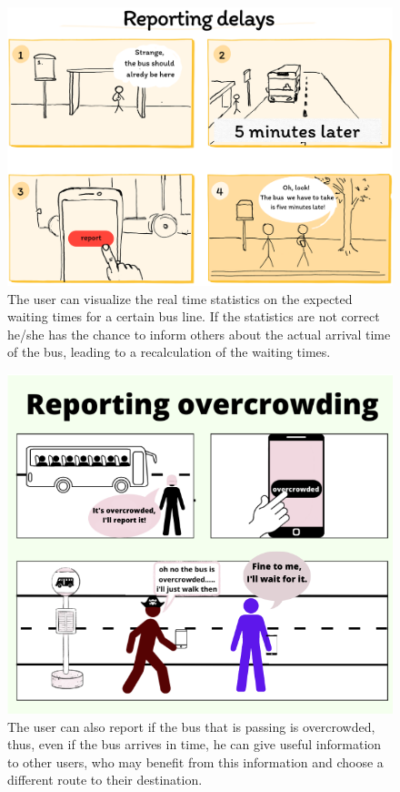 \documentclass[a4paper, 11pt]{report}
\begin{document}
\vspace{2cm}
\begin{figure}[H]
	\centering
	\includegraphics[width=.9\textwidth]{img/storyboards/storyboard_reporting_delays.png}%
	\caption{The user can visualize the real time statistics on the expected waiting times for a certain bus line.
		If the statistics are not correct he/she has the chance to inform others about the actual arrival
		time of the bus, leading to a recalculation of the waiting times.}\label{fig:b}
\end{figure}
\newpage%


\vspace{2cm}
\begin{figure}[H]
	\centering
	\includegraphics[width=.9\textwidth]{img/storyboards/storyboard_overcrowding2.png}
	\caption{The user can also report if the bus that is passing is overcrowded,
		thus, even if the bus arrives in time, he can give useful information to other users,
		who may benefit from this information and choose a different route to their destination.}\label{fig:c}
\end{figure}
\newpage%
\end{document}
